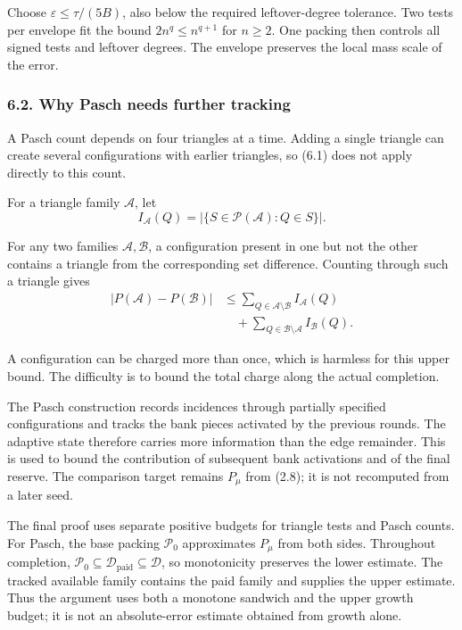 \documentclass[english,11pt,a4paper]{article}
\begin{document}
Choose \(\varepsilon\leq\tau/(5B)\), also below the required leftover-degree tolerance. Two tests per envelope fit the bound \(2n^q\leq n^{q+1}\) for \(n\geq2\). One packing then controls all signed tests and leftover degrees. The envelope preserves the local mass scale of the error.

\subsubsection{6.2. Why Pasch needs further tracking}\label{why-pasch-needs-further-tracking}

A Pasch count depends on four triangles at a time. Adding a single triangle can create several configurations with earlier triangles, so (6.1) does not apply directly to this count.

For a triangle family \(\mathcal A\), let
\[I_{\mathcal A}(Q)=
|\{S\in\mathcal P(\mathcal A):Q\in S\}|.\]

For any two families \(\mathcal A,\mathcal B\), a configuration present in one but not the other contains a triangle from the corresponding set difference. Counting through such a triangle gives
\[\begin{aligned}
|P(\mathcal A)-P(\mathcal B)|
&\leq\sum_{Q\in\mathcal A\setminus\mathcal B}I_{\mathcal A}(Q)\\
&\quad+\sum_{Q\in\mathcal B\setminus\mathcal A}I_{\mathcal B}(Q).
\end{aligned}                                                       \tag{6.2}\]

A configuration can be charged more than once, which is harmless for this upper bound. The difficulty is to bound the total charge along the actual completion.

The Pasch construction records incidences through partially specified configurations and tracks the bank pieces activated by the previous rounds. The adaptive state therefore carries more information than the edge remainder. This is used to bound the contribution of subsequent bank activations and of the final reserve. The comparison target remains \(P_\mu\) from (2.8); it is not recomputed from a later seed.

The final proof uses separate positive budgets for triangle tests and Pasch counts. For Pasch, the base packing \(\mathcal P_0\) approximates \(P_\mu\) from both sides. Throughout completion, \(\mathcal P_0\subseteq\mathcal D_{\mathrm{paid}}\subseteq\mathcal D\), so monotonicity preserves the lower estimate. The tracked available family contains the paid family and supplies the upper estimate. Thus the argument uses both a monotone sandwich and the upper growth budget; it is not an absolute-error estimate obtained from growth alone.
\end{document}
